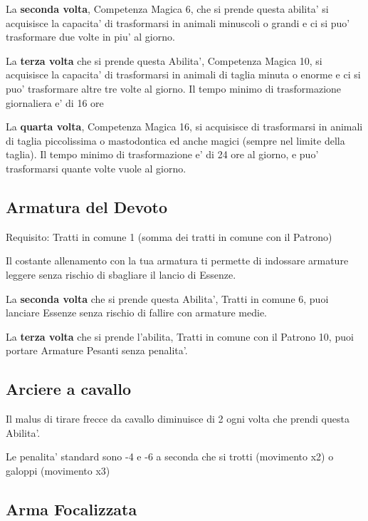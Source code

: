 \documentclass[a4paper,11pt,twoside,openany]{book}
\begin{document}
	La \textbf{seconda volta}, Competenza Magica 6, che si prende questa abilita' si acquisisce la capacita' di trasformarsi in animali minuscoli o grandi e ci si puo' trasformare due volte in piu' al giorno. 
	
	La \textbf{terza volta} che si prende questa Abilita', Competenza Magica 10, si acquisisce la capacita' di trasformarsi in animali di taglia minuta o enorme e ci si puo' trasformare altre tre volte al giorno. Il tempo minimo di trasformazione giornaliera e' di 16 ore
	
	La \textbf{quarta volta}, Competenza Magica 16, si acquisisce di trasformarsi in animali di taglia piccolissima o mastodontica ed anche magici (sempre nel limite della taglia). Il tempo minimo di trasformazione e' di 24 ore al giorno, e puo' trasformarsi quante volte vuole al giorno.
	
	\subsection{Armatura del Devoto}
	
	Requisito: Tratti in comune 1 (somma dei tratti in comune con il Patrono)
	
	Il costante allenamento con la tua armatura ti permette di indossare armature leggere senza rischio di sbagliare il lancio di Essenze.
	
	La \textbf{seconda volta} che si prende questa Abilita', Tratti in comune 6, puoi lanciare Essenze senza rischio di fallire con armature medie.
	
	La \textbf{terza volta} che si prende l'abilita, Tratti in comune con il Patrono 10, puoi portare Armature Pesanti senza penalita'.
	
	\subsection{Arciere a cavallo}
	
	Il malus di tirare frecce da cavallo diminuisce di 2 ogni volta che prendi questa Abilita'.
	
	Le penalita' standard sono -4 e -6 a seconda che si trotti (movimento x2) o galoppi (movimento x3)
	
	\subsection{Arma Focalizzata}
	
\end{document}
